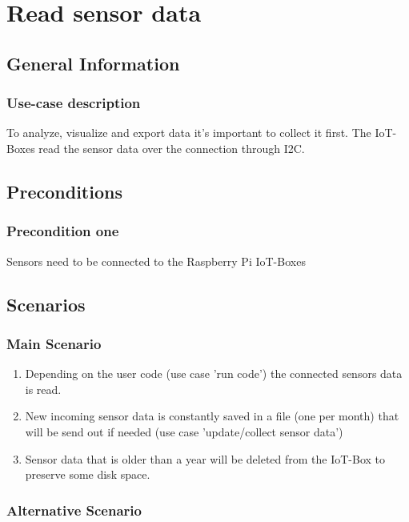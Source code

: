 \documentclass[notitlepage]{article}
\begin{document}
\section{Read sensor data}

\subsection{General Information}
\subsubsection{Use-case description}
To analyze, visualize and export data it's important to collect it first. The IoT-Boxes read the sensor data over the connection through I2C.

\subsection{Preconditions}

\subsubsection{Precondition one}
Sensors need to be connected to the Raspberry Pi IoT-Boxes

\subsection{Scenarios}

\subsubsection{Main Scenario}

\begin{enumerate}
	\item Depending on the user code (use case 'run code') the connected sensors data is read.
	\item New incoming sensor data is constantly saved in a file (one per month) that will be send out if needed (use case 'update/collect sensor data')
	\item Sensor data that is older than a year will be deleted from the IoT-Box to preserve some disk space. 
\end{enumerate}

\subsubsection{Alternative Scenario}
\end{document}
